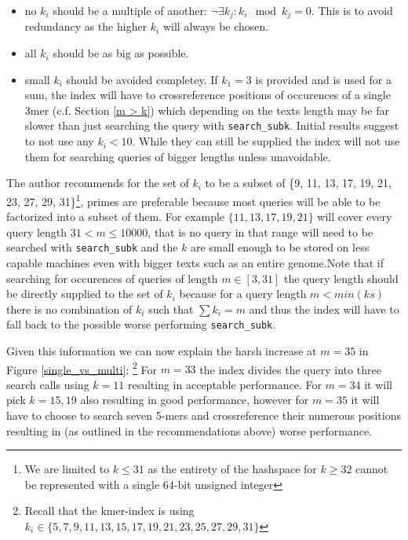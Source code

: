 \begin{itemize}
\item no $k_{i}$ should be a multiple of another: $\lnot\exists k_{j}:k_{i}\mod k_{j}=0$.
This is to avoid redundancy as the higher $k_{i}$ will always be chosen.
\item all $k_{i}$ should be as big as possible.
\item small $k_{i}$ should be avoided completey. If $k_{1}=3$ is provided
and is used for a sum, the index will have to crossreference positions of occurences of a single
3mer (c.f. Section \ref{m > k}) which depending on the texts length may be far slower
than just searching the query with \lstinline{search_subk}. Initial
results suggest to not use any $k_{i}<10$. While they can still be supplied
the index will not use them for searching queries of bigger lengths unless unavoidable.
\end{itemize}
The author recommends for the set of $k_{i}$ to be a subset of \{9,
11, 13, 17, 19, 21, 23, 27, 29, 31\}\footnote{We are limited to $k\leq31$ as the entirety of the hashspace for $k\geq32$ cannot be represented with a single 64-bit unsigned integer}, primes are preferable because
most queries will be able to be factorized into a subset of them.
For example $\{11,13,17,19,21\}$ will cover every query length $31<m\leq10000$, that is no
query in that range will need to be searched with \lstinline{search_subk}
and the $k$ are small enough to be stored on less capable machines
even with bigger texts such as an entire genome.\newline Note that if searching
for occurences of queries of length $m\in[3,31]$ the query length
should be directly supplied to the set of $k_{i}$ because for a query length $m < min(ks)$
there is no combination of $k_{i}$ such that $\sum k_{i} = m$ and thus the index will have to
fall back to the possible worse performing \lstinline{search_subk}.

Given this information we can now explain the harsh increase at $m=35$ in Figure \ref{single_vs_multi}:
\footnote{Recall that the kmer-index is using $k_{i}\in\{5, 7, 9, 11, 13, 15, 17, 19, 21, 23, 25, 27, 29, 31\}$}
For $m=33$ the index divides the query into three search calls using $k=11$ resulting in acceptable performance. For $m=34$ it will pick $k=15, 19$ also resulting in good performance,
however for $m=35$ it will have to choose to search seven 5-mers and crossreference their numerous positions resulting
in (as outlined in the recommendations above) worse performance.

